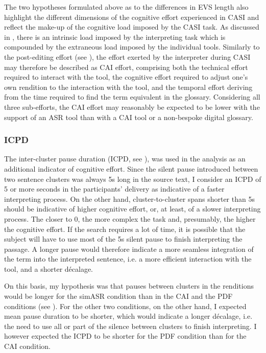 The two hypotheses formulated above as to the differences in EVS length also highlight the different dimensions of the cognitive effort experienced in CASI and reflect the make-up of the cognitive load imposed by the CASI task. As discussed in , there is an intrinsic load imposed by the interpreting task which is compounded by the extraneous load imposed by the individual tools. Similarly to the post-editing effort (see \citealt{krings2001repairing}), the effort exerted by the interpreter during CASI may therefore be described as CAI effort, comprising both the technical effort required to interact with the tool, the cognitive effort required to adjust one's own rendition to the interaction with the tool, and the temporal effort deriving from the time required to find the term equivalent in the glossary. Considering all three sub-efforts, the CAI effort may reasonably be expected to be lower with the support of an ASR tool than with a CAI tool or a non-bespoke digital glossary.

\subsubsection{ICPD} \label{ICPDdisc}
The inter-cluster pause duration (ICPD, see ), was used in the analysis as an additional indicator of cognitive effort. Since the silent pause introduced between two sentence clusters was always 5s long in the source text, I consider an ICPD of 5 or more seconds in the participants' delivery as indicative of a faster interpreting process. On the other hand, cluster-to-cluster spans shorter than 5s should be indicative of higher cognitive effort, or, at least, of a slower interpreting process. The closer to 0, the more complex the task and, presumably, the higher the cognitive effort. If the search requires a lot of time, it is possible that the subject will have to use most of the 5s silent pause to finish interpreting the passage. A longer pause would therefore indicate a more seamless integration of the term into the interpreted sentence, i.e. a more efficient interaction with the tool, and a shorter décalage.

On this basis, my hypothesis was that pauses between clusters in the renditions would be longer for the simASR condition than in the CAI and the PDF conditions (see ). For the other two conditions, on the other hand, I expected mean pause duration to be shorter, which would indicate a longer décalage, i.e. the need to use all or part of the silence between clusters to finish interpreting. I however expected the ICPD to be shorter for the PDF condition than for the CAI condition.

